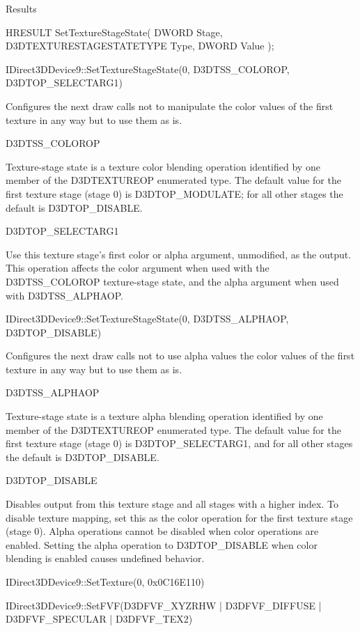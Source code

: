 \iffalse
Results


HRESULT SetTextureStageState(
  DWORD                    Stage,
  D3DTEXTURESTAGESTATETYPE Type,
  DWORD                    Value
);

IDirect3DDevice9::SetTextureStageState(0, D3DTSS_COLOROP, D3DTOP_SELECTARG1)

Configures the next draw calls not to manipulate the color values of the first texture in any way but to use them as is.

D3DTSS_COLOROP

Texture-stage state is a texture color blending operation identified by one member of the D3DTEXTUREOP enumerated type. The default value for the first texture stage (stage 0) is D3DTOP_MODULATE; for all other stages the default is D3DTOP_DISABLE.

D3DTOP_SELECTARG1

Use this texture stage's first color or alpha argument, unmodified, as the output. This operation affects the color argument when used with the D3DTSS_COLOROP texture-stage state, and the alpha argument when used with D3DTSS_ALPHAOP.



IDirect3DDevice9::SetTextureStageState(0, D3DTSS_ALPHAOP, D3DTOP_DISABLE)	

Configures the next draw calls not to use alpha values the color values of the first texture in any way but to use them as is.

D3DTSS_ALPHAOP

Texture-stage state is a texture alpha blending operation identified by one member of the D3DTEXTUREOP enumerated type. The default value for the first texture stage (stage 0) is D3DTOP_SELECTARG1, and for all other stages the default is D3DTOP_DISABLE.


D3DTOP_DISABLE

Disables output from this texture stage and all stages with a higher index. To disable texture mapping, set this as the color operation for the first texture stage (stage 0). Alpha operations cannot be disabled when color operations are enabled. Setting the alpha operation to D3DTOP_DISABLE when color blending is enabled causes undefined behavior.


IDirect3DDevice9::SetTexture(0, 0x0C16E110)				






IDirect3DDevice9::SetFVF(D3DFVF_XYZRHW | D3DFVF_DIFFUSE | D3DFVF_SPECULAR | D3DFVF_TEX2)					



